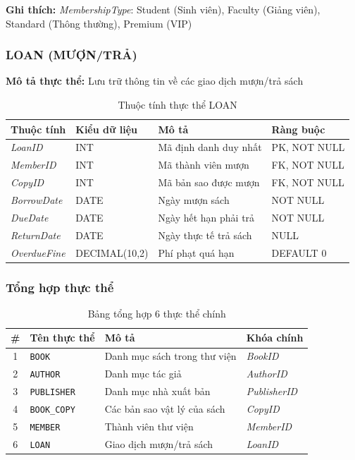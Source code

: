 \documentclass[12pt,a4paper]{article}
\newcommand{\entity}[1]{\texttt{#1}}
\newcommand{\attr}[1]{\textit{#1}}
\begin{document}
\textbf{Ghi thích:} \attr{MembershipType}: Student (Sinh viên), Faculty (Giảng viên), Standard (Thông thường), Premium (VIP)

\subsubsection{LOAN (MƯỢN/TRẢ)}

\textbf{Mô tả thực thể:} Lưu trữ thông tin về các giao dịch mượn/trả sách

\begin{table}[H]
\centering
\caption{Thuộc tính thực thể LOAN}
\begin{tabular}{@{}|l|l|p{6cm}|l|@{}}
\hline
\textbf{Thuộc tính} & \textbf{Kiểu dữ liệu} & \textbf{Mô tả} & \textbf{Ràng buộc} \\ \hline
\attr{LoanID} & INT & Mã định danh duy nhất & PK, NOT NULL \\ \hline
\attr{MemberID} & INT & Mã thành viên mượn & FK, NOT NULL \\ \hline
\attr{CopyID} & INT & Mã bản sao được mượn & FK, NOT NULL \\ \hline
\attr{BorrowDate} & DATE & Ngày mượn sách & NOT NULL \\ \hline
\attr{DueDate} & DATE & Ngày hết hạn phải trả & NOT NULL \\ \hline
\attr{ReturnDate} & DATE & Ngày thực tế trả sách & NULL \\ \hline
\attr{OverdueFine} & DECIMAL(10,2) & Phí phạt quá hạn & DEFAULT 0 \\ \hline
\end{tabular}
\end{table}

\subsubsection{Tổng hợp thực thể}

\begin{table}[H]
\centering
\caption{Bảng tổng hợp 6 thực thể chính}
\begin{tabular}{|c|l|l|l|}
\hline
\textbf{\#} & \textbf{Tên thực thể} & \textbf{Mô tả} & \textbf{Khóa chính} \\ \hline
1 & \entity{BOOK} & Danh mục sách trong thư viện & \attr{BookID} \\ \hline
2 & \entity{AUTHOR} & Danh mục tác giả & \attr{AuthorID} \\ \hline
3 & \entity{PUBLISHER} & Danh mục nhà xuất bản & \attr{PublisherID} \\ \hline
4 & \entity{BOOK\_COPY} & Các bản sao vật lý của sách & \attr{CopyID} \\ \hline
5 & \entity{MEMBER} & Thành viên thư viện & \attr{MemberID} \\ \hline
6 & \entity{LOAN} & Giao dịch mượn/trả sách & \attr{LoanID} \\ \hline
\end{tabular}
\end{table}
\end{document}
